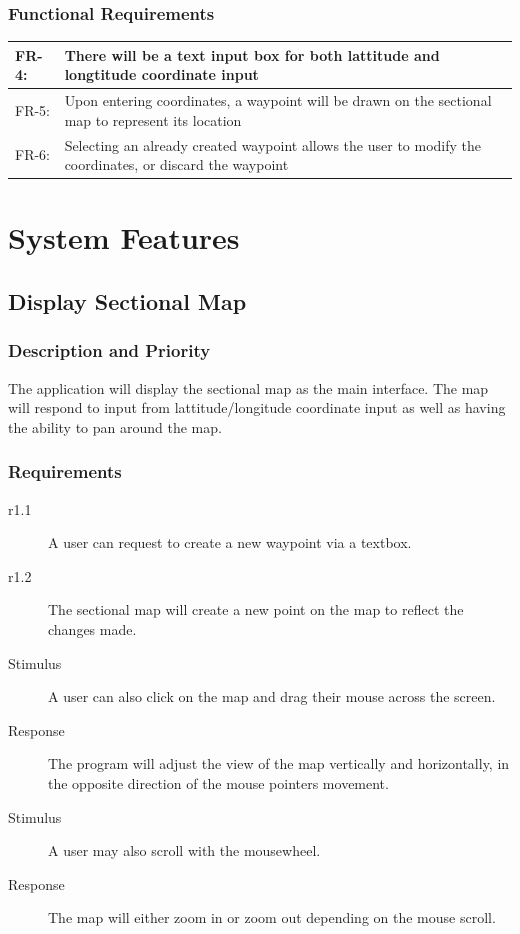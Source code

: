 \documentclass[12pt, letterpaper]{article}
\begin{document}
      \subsubsection{Functional Requirements}
      \begin{tabularx}{\textwidth}{|l|X|} \hline
        FR-4: & There will be a text input box for both lattitude and longtitude coordinate input\\ \hline
        FR-5: & Upon entering coordinates, a waypoint will be drawn on the sectional map to represent its location\\ \hline
        FR-6: & Selecting an already created waypoint allows the user to modify the coordinates, or discard the waypoint\\ \hline
        \end{tabularx}

\section{System Features}
  \subsection{Display Sectional Map}
    \subsubsection{Description and Priority}
      The application will display the sectional map as the main interface.
      The map will respond to input from lattitude/longitude coordinate input as well
      as having the ability to pan around the map.
    \subsubsection{Requirements}
      \begin{description}
        \item[r1.1] A user can request to create a new waypoint via a textbox.
		\item[r1.2]	The sectional map will create a new point on the map to
			reflect the changes made.
		\item[Stimulus] A user can also click on the map and drag their mouse
			across the screen.
    \item[Response] The program will adjust the view of the map vertically and horizontally,
			in the opposite direction of the mouse pointers movement.
		\item[Stimulus] A user may also scroll with the mousewheel.
		\item[Response] The map will either zoom in or zoom out depending on the mouse scroll.
      \end{description}
\end{document}
